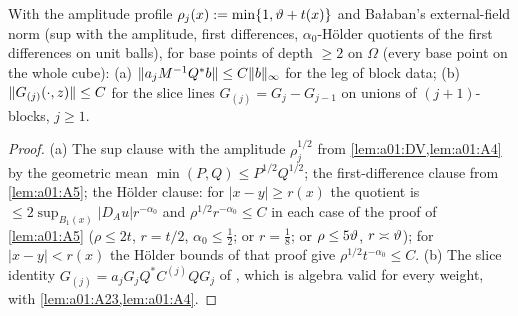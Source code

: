 \begin{corollary}\label{lem:a01:legs}
With the amplitude profile $\rho_j(x):=\min\{1,\vartheta+t(x)\}$ and Ba{\l}aban's external-field norm \cite[(1.32)]{Ba3} (sup with the amplitude, first differences, $\alpha_0$-H\"older quotients of the first differences on unit balls), for base points of depth $\ge2$ on $\Omega$ (every base point on the whole cube): (a) $\lVert a_jM^{-1}Q^*b\rVert\le C\lVert b\rVert_\infty$ for the leg of block data; (b) $\lVert G_{(j)}(\cdot,z)\rVert\le C$ for the slice lines $G_{(j)}=G_j-G_{j-1}$ on unions of $(j+1)$-blocks, $j\ge1$.
\end{corollary}
\begin{proof}
(a) The sup clause with the amplitude $\rho_j^{1/2}$ from \cref{lem:a01:DV,lem:a01:A4} by the geometric mean $\min(P,Q)\le P^{1/2}Q^{1/2}$; the first-difference clause from \cref{lem:a01:A5}; the H\"older clause: for $|x-y|\ge r(x)$ the quotient is $\le2\sup_{B_1(x)}|D_Au|r^{-\alpha_0}$ and $\rho^{1/2}r^{-\alpha_0}\le C$ in each case of the proof of \cref{lem:a01:A5} ($\rho\le2t$, $r=t/2$, $\alpha_0\le\frac12$; or $r=\frac18$; or $\rho\le5\vartheta$, $r\asymp\vartheta$); for $|x-y|<r(x)$ the H\"older bounds of that proof give $\rho^{1/2}t^{-\alpha_0}\le C$. (b) The slice identity $G_{(j)}=a_jG_jQ^*C^{(j)}QG_j$ of \cite[(2.17)]{K1}, which is algebra valid for every weight, with \cref{lem:a01:A23,lem:a01:A4}.
\end{proof}
